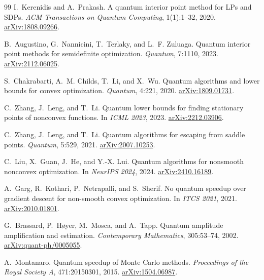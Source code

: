 \documentclass[11pt,a4paper]{article}
\theoremstyle{definition}
\begin{document}
\begin{thebibliography}{99}
I.~Kerenidis and A.~Prakash.
\newblock A quantum interior point method for LPs and SDPs.
\newblock \emph{ACM Transactions on Quantum Computing}, 1(1):1--32, 2020.
\newblock \href{https://arxiv.org/abs/1808.09266}{arXiv:1808.09266}.

B.~Augustino, G.~Nannicini, T.~Terlaky, and L.~F. Zuluaga.
\newblock Quantum interior point methods for semidefinite optimization.
\newblock \emph{Quantum}, 7:1110, 2023.
\newblock \href{https://arxiv.org/abs/2112.06025}{arXiv:2112.06025}.

S.~Chakrabarti, A.~M. Childs, T.~Li, and X.~Wu.
\newblock Quantum algorithms and lower bounds for convex optimization.
\newblock \emph{Quantum}, 4:221, 2020.
\newblock \href{https://arxiv.org/abs/1809.01731}{arXiv:1809.01731}.

C.~Zhang, J.~Leng, and T.~Li.
\newblock Quantum lower bounds for finding stationary points of nonconvex functions.
\newblock In \emph{ICML 2023}, 2023.
\newblock \href{https://arxiv.org/abs/2212.03906}{arXiv:2212.03906}.

C.~Zhang, J.~Leng, and T.~Li.
\newblock Quantum algorithms for escaping from saddle points.
\newblock \emph{Quantum}, 5:529, 2021.
\newblock \href{https://arxiv.org/abs/2007.10253}{arXiv:2007.10253}.

C.~Liu, X.~Guan, J.~He, and Y.-X. Lui.
\newblock Quantum algorithms for nonsmooth nonconvex optimization.
\newblock In \emph{NeurIPS 2024}, 2024.
\newblock \href{https://arxiv.org/abs/2410.16189}{arXiv:2410.16189}.

A.~Garg, R.~Kothari, P.~Netrapalli, and S.~Sherif.
\newblock No quantum speedup over gradient descent for non-smooth convex optimization.
\newblock In \emph{ITCS 2021}, 2021.
\newblock \href{https://arxiv.org/abs/2010.01801}{arXiv:2010.01801}.

G.~Brassard, P.~H{\o}yer, M.~Mosca, and A.~Tapp.
\newblock Quantum amplitude amplification and estimation.
\newblock \emph{Contemporary Mathematics}, 305:53--74, 2002.
\newblock \href{https://arxiv.org/abs/quant-ph/0005055}{arXiv:quant-ph/0005055}.

A.~Montanaro.
\newblock Quantum speedup of Monte Carlo methods.
\newblock \emph{Proceedings of the Royal Society A}, 471:20150301, 2015.
\newblock \href{https://arxiv.org/abs/1504.06987}{arXiv:1504.06987}.


\end{thebibliography}
\end{document}
